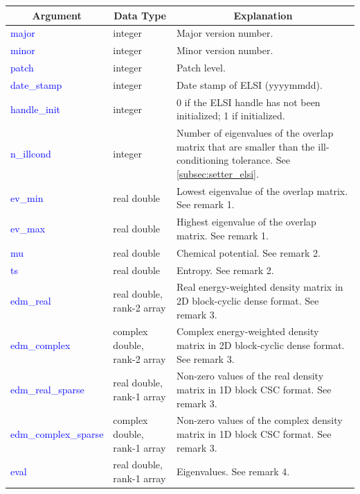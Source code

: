 \documentclass{report}
\newcommand{\tcb}[1]{\textcolor{blue}{#1}}
\begin{document}
\begin{tabular}[]{|p{30mm}|p{45mm}|p{90mm}|}
\hline
\multicolumn{1}{|c|}{\textbf{Argument}} & \multicolumn{1}{c|}{\textbf{Data Type}} & \multicolumn{1}{c|}{\textbf{Explanation}}\\
\hline
\tcb{major}                & integer                      & Major version number.\\
\hline
\tcb{minor}                & integer                      & Minor version number.\\
\hline
\tcb{patch}                & integer                      & Patch level.\\
\hline
\tcb{date\_stamp}          & integer                      & Date stamp of ELSI (yyyymmdd).\\
\hline
\tcb{handle\_init}         & integer                      & 0 if the ELSI handle has not been initialized; 1 if initialized.\\
\hline
\tcb{n\_illcond}           & integer                      & Number of eigenvalues of the overlap matrix that are smaller than the ill-conditioning tolerance. See \ref{subsec:setter_elsi}.\\
\hline
\tcb{ev\_min}              & real double                  & Lowest eigenvalue of the overlap matrix. See remark 1.\\
\hline
\tcb{ev\_max}              & real double                  & Highest eigenvalue of the overlap matrix. See remark 1.\\
\hline
\tcb{mu}                   & real double                  & Chemical potential. See remark 2.\\
\hline
\tcb{ts}                   & real double                  & Entropy. See remark 2.\\
\hline
\tcb{edm\_real}            & real double, rank-2 array    & Real energy-weighted density matrix in 2D block-cyclic dense format. See remark 3.\\
\hline
\tcb{edm\_complex}         & complex double, rank-2 array & Complex energy-weighted density matrix in 2D block-cyclic dense format. See remark 3.\\
\hline
\tcb{edm\_real\_sparse}    & real double, rank-1 array    & Non-zero values of the real density matrix in 1D block CSC format. See remark 3.\\
\hline
\tcb{edm\_complex\_sparse} & complex double, rank-1 array & Non-zero values of the complex density matrix in 1D block CSC format. See remark 3.\\
\hline
\tcb{eval}                 & real double, rank-1 array    & Eigenvalues. See remark 4.\\

\end{tabular}
\end{document}
